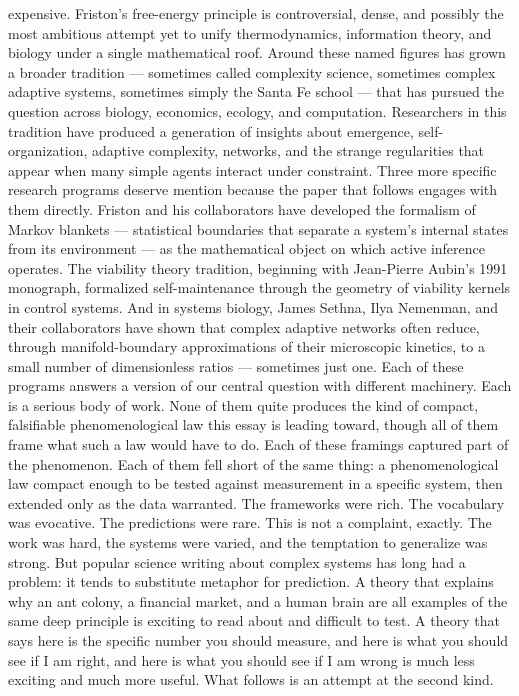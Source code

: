 \documentclass[12pt]{article}
\begin{document}
expensive. Friston's free-energy principle is controversial, dense, and possibly the most ambitious attempt yet to unify thermodynamics, information theory, and biology under a single mathematical roof. Around these named figures has grown a broader tradition --- sometimes called complexity science, sometimes complex adaptive systems, sometimes simply the Santa Fe school --- that has pursued the question across biology, economics, ecology, and computation. Researchers in this tradition have produced a generation of insights about emergence, self-organization, adaptive complexity, networks, and the strange regularities that appear when many simple agents interact under constraint. Three more specific research programs deserve mention because the paper that follows engages with them directly. Friston and his collaborators have developed the formalism of Markov blankets --- statistical boundaries that separate a system's internal states from its environment --- as the mathematical object on which active inference operates. The viability theory tradition, beginning with Jean-Pierre Aubin's 1991 monograph, formalized self-maintenance through the geometry of viability kernels in control systems. And in systems biology, James Sethna, Ilya Nemenman, and their collaborators have shown that complex adaptive networks often reduce, through manifold-boundary approximations of their microscopic kinetics, to a small number of dimensionless ratios --- sometimes just one. Each of these programs answers a version of our central question with different machinery. Each is a serious body of work. None of them quite produces the kind of compact, falsifiable phenomenological law this essay is leading toward, though all of them frame what such a law would have to do. Each of these framings captured part of the phenomenon. Each of them fell short of the same thing: a phenomenological law compact enough to be tested against measurement in a specific system, then extended only as the data warranted. The frameworks were rich. The vocabulary was evocative. The predictions were rare. This is not a complaint, exactly. The work was hard, the systems were varied, and the temptation to generalize was strong. But popular science writing about complex systems has long had a problem: it tends to substitute metaphor for prediction. A theory that explains why an ant colony, a financial market, and a human brain are all examples of the same deep principle is exciting to read about and difficult to test. A theory that says here is the specific number you should measure, and here is what you should see if I am right, and here is what you should see if I am wrong is much less exciting and much more useful. What follows is an attempt at the second kind.
\end{document}
